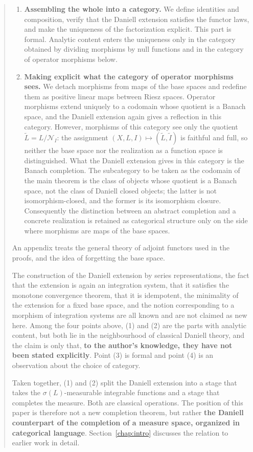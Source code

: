 \begin{abstract}
\begin{enumerate}
    two reflections to agree.
  \item \textbf{Assembling the whole into a category.}
    We define identities and composition, verify that the Daniell extension
    satisfies the functor laws, and make the uniqueness of the factorization
    explicit. This part is formal. Analytic content enters the uniqueness only
    in the category obtained by dividing morphisms by null functions and in the
    category of operator morphisms below.
  \item \textbf{Making explicit what the category of operator morphisms sees.}
    We detach morphisms from maps of the base spaces and redefine them as
    positive linear maps between Riesz spaces. Operator morphisms extend
    uniquely to a codomain whose quotient is a Banach space, and the Daniell
    extension again gives a reflection in this category. However, morphisms of
    this category see only the quotient $\widetilde{L}=L/\mathcal{N}_I$: the
    assignment $(X,L,I)\mapsto(\widetilde{L},\widetilde{I})$ is faithful and
    full, so neither the base space nor the realization as a function space is
    distinguished. What the Daniell extension gives in this category is the
    Banach completion. The subcategory to be taken as the codomain of the main
    theorem is the class of objects whose quotient is a Banach space, not the
    class of Daniell closed objects; the latter is not isomorphism-closed, and
    the former is its isomorphism closure. Consequently the distinction between
    an abstract completion and a concrete realization is retained as categorical
    structure only on the side where morphisms are maps of the base spaces.
\end{enumerate}

An appendix treats the general theory of adjoint functors used in the proofs,
and the idea of forgetting the base space.

The construction of the Daniell extension by series representations, the fact
that the extension is again an integration system, that it satisfies the
monotone convergence theorem, that it is idempotent, the minimality of the
extension for a fixed base space, and the notion corresponding to a morphism of
integration systems are all known and are not claimed as new here. Among the
four points above, (1) and (2) are the parts with analytic content, but both lie
in the neighbourhood of classical Daniell theory, and the claim is only that,
\textbf{to the author's knowledge, they have not been stated explicitly}.
Point (3) is formal and point (4) is an observation about the choice of category.

Taken together, (1) and (2) split the Daniell extension into a stage that takes
the $\sigma(L)$-measurable integrable functions and a stage that completes the
measure. Both are classical operations. The position of this paper is therefore
not a new completion theorem, but rather
\textbf{the Daniell counterpart of the completion of a measure space, organized
in categorical language}.
Section~\ref{chap:intro} discusses the relation to earlier work in detail.
\end{abstract}
